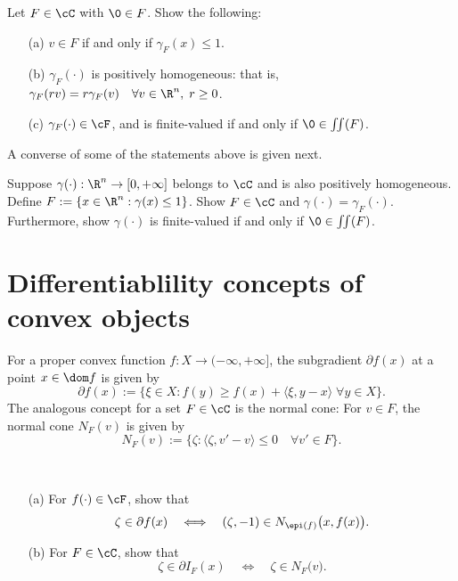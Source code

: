 \documentclass[12pt]{article}
\begin{document}
{\blue
\begin{exer}\label{exer: gauge}  Let $F\in\cC$ with $\0\in F$.  Show the following:
\begin{itemize}
\item[(a)]  $v\in F$ if and only if $\gamma_F(x)\leq 1$.
\item[(b)]  $\gamma_{F}(\cdot)$ is positively homogeneous: that is, $\gamma_{F}(r v)=r\gamma_{F}(v)\quad \forall v\in\R^n,\;r\geq 0$. 
\item[(c)]  $\gamma_{F}(\cdot)\in\cF$, and is finite-valued if and only if $\0\in\iint(F)$.
\end{itemize}
\end{exer}
}

A converse of some of the statements above is given next.

{\blue 
\begin{exer}
Suppose $\gamma(\cdot):\R^n\to[0,+\infty]$ belongs to $\cC$ and is also positively homogeneous.  Define $F:=\{x\in\R^n:\gamma(x)\leq 1\}$.  Show $F\in\cC$ and $\gamma(\cdot)=\gamma_F(\cdot)$.  Furthermore, show $\gamma(\cdot)$ is finite-valued if and only if $\0\in\iint(F)$. 
\end{exer}
}

\section{Differentiablility concepts of convex objects}
For a proper convex function
$f:X\to(-\infty,+\infty]$, the subgradient $\partial f(x)$ at a
point $x\in \dom f$ is given by
\begin{equation}\label{eq: subgrad}
\partial f(x):=\{\xi\in X:f(y)\geq f(x)+\langle
\xi,y-x\rangle\;\forall y\in X\}.
\end{equation}
The analogous concept for a set $F\in\cC$ is the normal cone:  For $v\in F$, the normal cone $N_F(v)$ is given by
\[
N_F(v):=\{\zeta:\langle \zeta,v'-v\rangle\leq 0\quad\forall v'\in
F\}.
\]

{\blue
\begin{exer}\label{exer: epi}\ 
\begin{itemize}
\item[(a)]  For $f(\cdot)\in\cF$, show that 
\begin{equation}\label{eq: sub}
\zeta\in\partial f(x) \quad \Longleftrightarrow\quad
(\zeta,-1)\in N_{\epi(f)} \bigl(x,f(x)\bigr).
\end{equation}
\item[(b)]
For $F\in\cC$, show that
\begin{equation}\label{eq: sub ind}
\zeta\in\partial I_{F}(x) \quad \Longleftrightarrow\quad
\zeta\in N_{F} \bigl(v\bigr).
\end{equation}
\end{itemize}
\end{exer}} 
\end{document}
